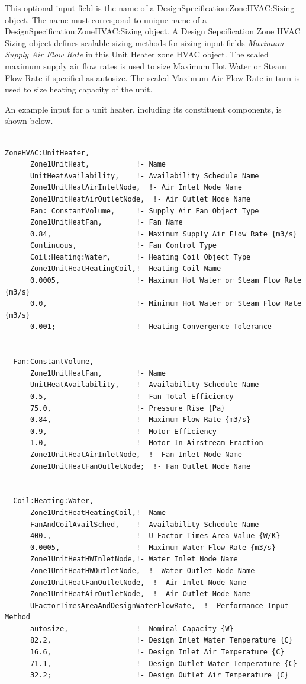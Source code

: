 This optional input field is the name of a DesignSpecification:ZoneHVAC:Sizing object. The name must correspond to unique name of a DesignSpecification:ZoneHVAC:Sizing object. A Design Sepcification Zone HVAC Sizing object defines scalable sizing methods for sizing input fields \emph{Maximum Supply Air Flow Rate} in this Unit Heater zone HVAC object. The scaled maximum supply air flow rates is used to size Maximum Hot Water or Steam Flow Rate if specified as autosize. The scaled Maximum Air Flow Rate in turn is used to size heating capacity of the unit.

An example input for a unit heater, including its constituent components, is shown below.

\begin{lstlisting}

ZoneHVAC:UnitHeater,
      Zone1UnitHeat,           !- Name
      UnitHeatAvailability,    !- Availability Schedule Name
      Zone1UnitHeatAirInletNode,  !- Air Inlet Node Name
      Zone1UnitHeatAirOutletNode,  !- Air Outlet Node Name
      Fan: ConstantVolume,     !- Supply Air Fan Object Type
      Zone1UnitHeatFan,        !- Fan Name
      0.84,                    !- Maximum Supply Air Flow Rate {m3/s}
      Continuous,              !- Fan Control Type
      Coil:Heating:Water,      !- Heating Coil Object Type
      Zone1UnitHeatHeatingCoil,!- Heating Coil Name
      0.0005,                  !- Maximum Hot Water or Steam Flow Rate {m3/s}
      0.0,                     !- Minimum Hot Water or Steam Flow Rate {m3/s}
      0.001;                   !- Heating Convergence Tolerance


  Fan:ConstantVolume,
      Zone1UnitHeatFan,        !- Name
      UnitHeatAvailability,    !- Availability Schedule Name
      0.5,                     !- Fan Total Efficiency
      75.0,                    !- Pressure Rise {Pa}
      0.84,                    !- Maximum Flow Rate {m3/s}
      0.9,                     !- Motor Efficiency
      1.0,                     !- Motor In Airstream Fraction
      Zone1UnitHeatAirInletNode,  !- Fan Inlet Node Name
      Zone1UnitHeatFanOutletNode;  !- Fan Outlet Node Name


  Coil:Heating:Water,
      Zone1UnitHeatHeatingCoil,!- Name
      FanAndCoilAvailSched,    !- Availability Schedule Name
      400.,                    !- U-Factor Times Area Value {W/K}
      0.0005,                  !- Maximum Water Flow Rate {m3/s}
      Zone1UnitHeatHWInletNode,!- Water Inlet Node Name
      Zone1UnitHeatHWOutletNode,  !- Water Outlet Node Name
      Zone1UnitHeatFanOutletNode,  !- Air Inlet Node Name
      Zone1UnitHeatAirOutletNode,  !- Air Outlet Node Name
      UFactorTimesAreaAndDesignWaterFlowRate,  !- Performance Input Method
      autosize,                !- Nominal Capacity {W}
      82.2,                    !- Design Inlet Water Temperature {C}
      16.6,                    !- Design Inlet Air Temperature {C}
      71.1,                    !- Design Outlet Water Temperature {C}
      32.2;                    !- Design Outlet Air Temperature {C}
\end{lstlisting}

